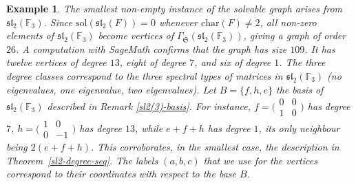 \documentclass[11pt]{amsart}
\theoremstyle{plain}
\newtheorem{example}[theorem]{Example}
\def\F{\mathbb{F}}
\def\ch{\mathrm{char}}
\def\sol{\mathrm{sol}}
\begin{document}
\begin{example}\label{Example4.2}
The smallest non-empty instance of the solvable graph arises from $\mathfrak{sl}_2(\F_3)$. Since $\sol(\mathfrak{sl}_2(F))=0$ whenever $\ch(F)\neq 2$, all non-zero elements of $\mathfrak{sl}_2(\F_3)$ become vertices of $\Gamma_\mathfrak{S}(\mathfrak{sl}_2(\F_3))$, giving a graph of order $26$. A computation with SageMath confirms that the graph has size $109$. It has twelve vertices of degree $13$, eight of degree $7$, and six of degree $1$. The three degree classes correspond to the three spectral types of matrices in $\mathfrak{sl}_2(\F_3)$ (no eigenvalues, one eigenvalue, two eigenvalues). Let $B=\{f, h, e\}$ the basis of $\mathfrak{sl}_2(\F_3)$ described in Remark \ref{sl2(3)-basis}.  For instance, $f=\bigl(\begin{smallmatrix}0&0\\ 1&0\end{smallmatrix}\bigr)$ has degree $7$, $h=\bigl(\begin{smallmatrix}1&0\\ 0&-1\end{smallmatrix}\bigr)$ has degree $13$, while $e+f+h$ has degree $1$, its only neighbour being $2(e+f+h)$. This corroborates, in the smallest case, the description in Theorem~\ref{sl2-degree-seq}. The labels $(a,b,c)$ that we use for the vertices correspond to their coordinates with respect to the base $B$.

\begin{figure}[H]
\begin{center}
\end{center}
\end{figure}
\end{example}
\end{document}
